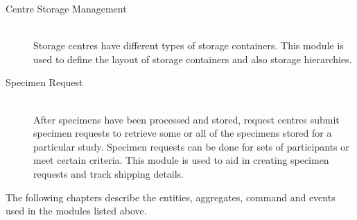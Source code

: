 \begin{description}
  \item[Centre Storage Management] \hfill \\ Storage centres have different
    types of storage containers. This module is used to define the layout of
    storage containers and also storage hierarchies.

  \item[Specimen Request] \hfill \\ After specimens have been processed and
    stored, request centres submit specimen requests to retrieve some or all of
    the specimens stored for a particular study. Specimen requests can be done
    for sets of participants or meet certain criteria. This module is used to
    aid in creating specimen requests and track shipping details.

\end{description}

The following chapters describe the entities, aggregates, command and events
used in the  modules listed above.

